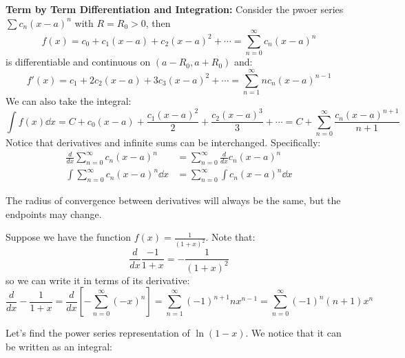 \begin{itemize}
    \begin{theorem}
        \textbf{Term by Term Differentiation and Integration:} Consider the pwoer series $\sum c_n(x-a)^n$ with $R=R_0 > 0$, then
        \begin{equation}
            f(x) = c_0 + c_1(x-a)+c_2(x-a)^2+\cdots = \sum_{n=0}^\infty c_n(x-a)^n
        \end{equation}
        is differentiable and continuous on $(a-R_0, a+R_0)$ and:
        \begin{equation}
            f'(x) = c_1 + 2c_2(x-a)+3c_3(x-a)^2+\cdots = \sum_{n=1}^\infty n c_n (x-a)^{n-1}
        \end{equation}
        We can also take the integral:
        \begin{equation}
            \int f(x) \dd{x} = C + c_0(x-a) + \frac{c_1(x-a)^2}{2} + \frac{c_2(x-a)^3}{3} + \cdots = C + \sum_{n=0}^\infty \frac{c_n(x-a)^{n+1}}{n+1}
        \end{equation}
        Notice that derivatives and infinite sums can be interchanged. Specifically:
        \begin{align}
            \frac{d}{dx} \sum_{n=0}^\infty c_n(x-a)^n &=  \sum_{n=0}^\infty \frac{d}{dx} c_n(x-a)^n \\ 
            \int \sum_{n=0}^\infty c_n(x-a)^n \dd{x} &=  \sum_{n=0}^\infty \int c_n(x-a)^n \dd{x}
        \end{align}
    \end{theorem}
    \begin{warning}
        The radius of convergence between derivatives will always be the same, but the endpoints may change.
    \end{warning}
    \begin{example}
        Suppose we have the function $f(x)=\frac{1}{(1+x)^2}$. Note that:
        \begin{equation}
            \frac{d}{dx} \frac{-1}{1+x} = -\frac{1}{(1+x)^2}
        \end{equation}
        so we can write it in terms of its derivative:
        \begin{equation}
            \frac{d}{dx} -\frac{1}{1+x} = \frac{d}{dx} \left[-\sum_{n=0}^\infty (-x)^n\right] = \sum_{n=1}^\infty (-1)^{n+1}nx^{n-1} = \sum_{n=0}^\infty (-1)^n(n+1)x^n
        \end{equation}
    \end{example}
    \begin{example}
        Let's find the power series representation of $\ln(1-x)$. We notice that it can be written as an integral:

\end{example}
\end{itemize}
